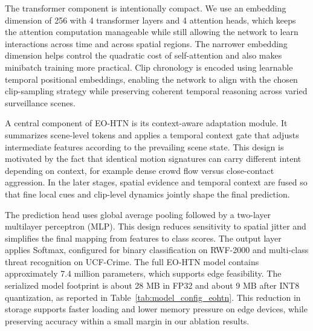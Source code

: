\documentclass[AMA,Times1COL]{WileyNJDv5} %
\begin{document}
The transformer component is intentionally compact. We use an embedding dimension of 256 with 4 transformer layers and 4 attention heads, which keeps the attention computation manageable while still allowing the network to learn interactions across time and across spatial regions. The narrower embedding dimension helps control the quadratic cost of self-attention and also makes minibatch training more practical. Clip chronology is encoded using learnable temporal positional embeddings, enabling the network to align with the chosen clip-sampling strategy while preserving coherent temporal reasoning across varied surveillance scenes.

A central component of EO-HTN is its context-aware adaptation module. It summarizes scene-level tokens and applies a temporal context gate that adjusts intermediate features according to the prevailing scene state. This design is motivated by the fact that identical motion signatures can carry different intent depending on context, for example dense crowd flow versus close-contact aggression. In the later stages, spatial evidence and temporal context are fused so that fine local cues and clip-level dynamics jointly shape the final prediction.


The prediction head uses global average pooling followed by a two-layer multilayer perceptron (MLP). This design reduces sensitivity to spatial jitter and simplifies the final mapping from features to class scores. The output layer applies Softmax, configured for binary classification on RWF-2000 and multi-class threat recognition on UCF-Crime. The full EO-HTN model contains approximately 7.4 million parameters, which supports edge feasibility. The serialized model footprint is about 28 MB in FP32 and about 9 MB after INT8 quantization, as reported in Table~\ref{tab:model_config_eohtn}. This reduction in storage supports faster loading and lower memory pressure on edge devices, while preserving accuracy within a small margin in our ablation results.
\end{document}
